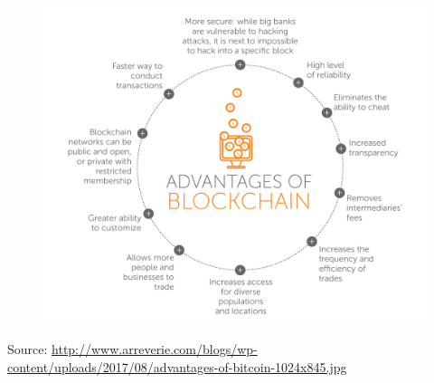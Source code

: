 \documentclass[11pt]{beamer}
\begin{document}
\begin{frame}
	\begin{figure}[]
		\centering
		\includegraphics  [scale=0.15]{Images/advantages}
	\end{figure}
	\begin{tiny}
		Source: \href{http://www.arreverie.com/blogs/blockchain-technology-everything-need-know/advantages-of-bitcoin/}{http://www.arreverie.com/blogs/wp-content/uploads/2017/08/advantages-of-bitcoin-1024x845.jpg}
	\end{tiny}
\end{frame}

\end{document}
